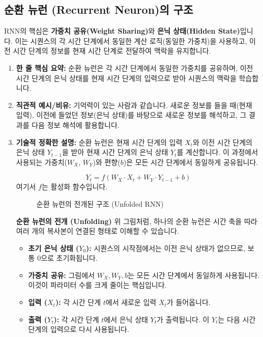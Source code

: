 \documentclass[11pt,a4paper]{article}
\theoremstyle{definition}
\begin{document}
\subsection{순환 뉴런 (Recurrent Neuron)의 구조}
RNN의 핵심은 \textbf{가중치 공유(Weight Sharing)}와 \textbf{은닉 상태(Hidden State)}입니다. 이는 시퀀스의 각 시간 단계에서 동일한 계산 로직(동일한 가중치)을 사용하고, 이전 시간 단계의 정보를 현재 시간 단계로 전달하여 맥락을 유지합니다.

\begin{enumerate}
    \item \textbf{한 줄 핵심 요약:} 순환 뉴런은 각 시간 단계에서 동일한 가중치를 공유하며, 이전 시간 단계의 은닉 상태를 현재 시간 단계의 입력으로 받아 시퀀스의 맥락을 학습합니다.
    \item \textbf{직관적 예시/비유:} 기억력이 있는 사람과 같습니다. 새로운 정보를 들을 때(현재 입력), 이전에 들었던 정보(은닉 상태)를 바탕으로 새로운 정보를 해석하고, 그 결과를 다음 정보 해석에 활용합니다.
    \item \textbf{기술적 정확한 설명:}
    순환 뉴런은 현재 시간 단계의 입력 $X_t$와 이전 시간 단계의 은닉 상태 $Y_{t-1}$을 받아 현재 시간 단계의 은닉 상태 $Y_t$를 계산합니다. 이 과정에서 사용되는 가중치($W_X$, $W_Y$)와 편향($b$)은 모든 시간 단계에서 동일하게 공유됩니다.

    \begin{equation*}
    Y_t = f(W_X \cdot X_t + W_Y \cdot Y_{t-1} + b)
    \end{equation*}
    여기서 $f$는 활성화 함수입니다.

    \begin{figure}[h!]
    \centering
    \caption{순환 뉴런의 전개된 구조 (Unfolded RNN)}
    \label{fig:rnn_unfolded}
    \end{figure}

    \textbf{순환 뉴런의 전개 (Unfolding)}
    위 그림처럼, 하나의 순환 뉴런은 시간 축을 따라 여러 개의 복사본이 연결된 형태로 이해할 수 있습니다.
    \begin{itemize}
        \item \textbf{초기 은닉 상태 ($Y_0$):} 시퀀스의 시작점에서는 이전 은닉 상태가 없으므로, 보통 0으로 초기화됩니다.
        \item \textbf{가중치 공유:} 그림에서 $W_X, W_Y, b$는 모든 시간 단계에서 동일하게 사용됩니다. 이것이 파라미터 수를 크게 줄이는 핵심입니다.
        \item \textbf{입력 ($X_t$):} 각 시간 단계 $t$에서 새로운 입력 $X_t$가 들어옵니다.
        \item \textbf{출력 ($Y_t$):} 각 시간 단계 $t$에서 은닉 상태 $Y_t$가 출력됩니다. 이 $Y_t$는 다음 시간 단계의 입력으로 다시 사용됩니다.
    \end{itemize}


\end{enumerate}
\end{document}
